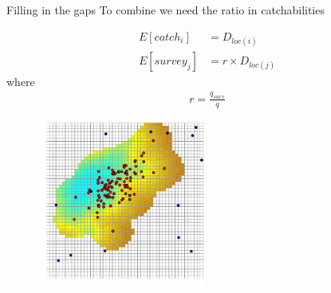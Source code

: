 \documentclass{beamer}
\begin{document}
\begin{frame}{Filling in the gaps}
To combine we need the ratio in catchabilities\\
\begin{minipage}{0.4\textwidth}
  \begin{flushleft}
    \begin{align*}
      E[catch_i] &= D_{loc(i)} \\
      E[survey_j] &= r \times D_{loc(j)}  
    \end{align*}
    where
    \begin{align*}
      r = \frac{q_{surv}}{q}  
    \end{align*}    
  \end{flushleft}
\end{minipage}
\hspace{0.5cm}
\begin{minipage}{0.4\textwidth}
  \begin{figure}
    \centering
    \includegraphics[width=5.5cm]{fig7}
  \end{figure}
\end{minipage}
\end{frame}
\end{document}
